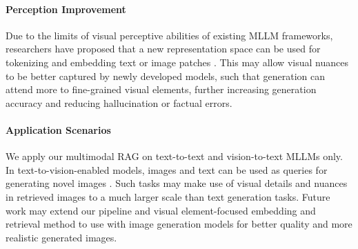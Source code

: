 \paragraph{Perception Improvement}
Due to the limits of visual perceptive abilities of existing MLLM frameworks, researchers have proposed that a 
new representation space can be used for tokenizing and embedding text or image patches \cite{chen2026babyvisionvisualreasoninglanguage}.
This may allow visual nuances to be better captured by newly developed models, such that generation can attend more to fine-grained visual elements,
further increasing generation accuracy and reducing hallucination or factual errors.

\paragraph{Application Scenarios}
We apply our multimodal RAG on text-to-text and vision-to-text MLLMs only.
In text-to-vision-enabled models, images and text can be used as queries for generating novel images \cite{NEURIPS2023_43a69d14}.
Such tasks may make use of visual details and nuances in retrieved images to a much larger scale than text generation tasks.
Future work may extend our pipeline and visual element-focused embedding and retrieval method to use with image generation models
for better quality and more realistic generated images.